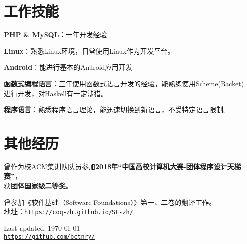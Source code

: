 \documentclass[a4paper]{article}
\def\footerlink{https://github.com/bctnry/}
\renewenvironment{itemize}{
  \begin{list}{}{
    \setlength{\leftmargin}{1.5em}
  }
}{
  \end{list}
}
\begin{document}
\section*{工作技能}

\begin{itemize}
  \item{\textbf{PHP \& MySQL}：一年开发经验}
  \item{\textbf{Linux}：熟悉Linux环境，日常使用Linux作为开发平台。}
  \item{\textbf{Android}：能进行基本的Android应用开发}
  \item{\textbf{函数式编程语言}：三年使用函数式语言开发的经验，能熟练使用Scheme(Racket)进行开发，对Haskell有一定涉猎。}
    \item{\textbf{程序语言}：熟悉程序语言理论，能迅速切换到新语言，不受特定语言限制。}
\end{itemize}
  

\section*{其他经历}

\begin{itemize}
  \item{曾作为校ACM集训队队员参加\textbf{2018年“中国高校计算机大赛-团体程序设计天梯赛”}，\\获\textbf{团体国家级二等奖}。}
\item{曾参加《软件基础（Software Foundations）》第一、二卷的翻译工作。\\
  地址：\href{https://coq-zh.github.io/SF-zh/}{\tt https://coq-zh.github.io/SF-zh/}}
\end{itemize}

\bigskip

\begin{center}
  \begin{footnotesize}
    Last updated: \today \\
    \href{\footerlink}{\texttt{\footerlink}}
  \end{footnotesize}
\end{center}
\end{document}
